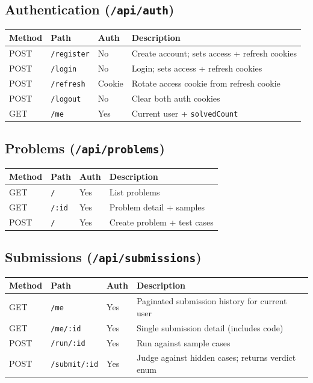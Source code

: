 \documentclass[11pt,a4paper]{article}
\begin{document}
\subsection{Authentication (\texttt{/api/auth})}
\begin{table}[h]
\centering
\small
\begin{tabular}{@{}lllp{4.5cm}@{}}
\toprule
\textbf{Method} & \textbf{Path} & \textbf{Auth} & \textbf{Description} \\
\midrule
POST & \texttt{/register} & No  & Create account; sets access + refresh cookies \\
POST & \texttt{/login}    & No  & Login; sets access + refresh cookies \\
POST & \texttt{/refresh}  & Cookie & Rotate access cookie from refresh cookie \\
POST & \texttt{/logout}   & No  & Clear both auth cookies \\
GET  & \texttt{/me}       & Yes & Current user + \texttt{solvedCount} \\
\bottomrule
\end{tabular}
\end{table}

\subsection{Problems (\texttt{/api/problems})}
\begin{table}[h]
\centering
\small
\begin{tabular}{@{}lllp{4.8cm}@{}}
\toprule
\textbf{Method} & \textbf{Path} & \textbf{Auth} & \textbf{Description} \\
\midrule
GET  & \texttt{/}     & Yes & List problems \\
GET  & \texttt{/:id}  & Yes & Problem detail + samples \\
POST & \texttt{/}     & Yes & Create problem + test cases \\
\bottomrule
\end{tabular}
\end{table}

\subsection{Submissions (\texttt{/api/submissions})}
\begin{table}[h]
\centering
\small
\begin{tabular}{@{}lllp{5cm}@{}}
\toprule
\textbf{Method} & \textbf{Path} & \textbf{Auth} & \textbf{Description} \\
\midrule
GET  & \texttt{/me}         & Yes & Paginated submission history for current user \\
GET  & \texttt{/me/:id}    & Yes & Single submission detail (includes code) \\
POST & \texttt{/run/:id}    & Yes & Run against sample cases \\
POST & \texttt{/submit/:id} & Yes & Judge against hidden cases; returns verdict enum \\
\bottomrule
\end{tabular}
\end{table}
\end{document}

